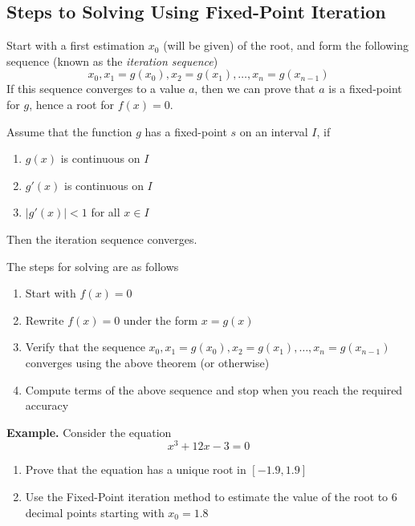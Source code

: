 \documentclass[openany]{report}
\begin{document}
\subsection{Steps to Solving Using Fixed-Point Iteration}
 Start with a first estimation $x_0$ (will be given) of the root, and form the following sequence (known as the \emph{iteration sequence})
    \[x_0, x_1 = g(x_0), x_2 = g(x_1), \dots, x_n = g(x_{n-1})\]
If this sequence converges to a value $a$, then we can prove that $a$ is a fixed-point for $g$, hence a root for $f(x) = 0$.
\begin{theorem}
    Assume that the function $g$ has a fixed-point $s$ on an interval $I$, if 
    \begin{enumerate}[label=(\roman*)]
        \item $g(x)$ is continuous on $I$
        \item $g'(x)$ is continuous on $I$
        \item $|g'(x)| < 1$ for all $x \in I$
    \end{enumerate}
    Then the iteration sequence converges.
\end{theorem}
\noindent
The steps for solving are as follows 
\begin{enumerate}
    \item Start with $f(x) = 0$
    \item Rewrite $f(x) = 0$ under the form $x = g(x)$
    \item Verify that the sequence $x_0, x_1 = g(x_0), x_2 = g(x_1), \dots, x_n = g(x_{n-1})$ converges using the above theorem (or otherwise)
    \item Compute terms of the above sequence and stop when you reach the required accuracy
\end{enumerate}
\textbf{Example.} Consider the equation 
\[x^3 + 12x - 3 = 0\]
\begin{enumerate}
    \item Prove that the equation has a unique root in $[-1.9, 1.9]$
    \item Use the Fixed-Point iteration method to estimate the value of the root to 6 decimal points starting with $x_0 = 1.8$
\end{enumerate}
\end{document}
